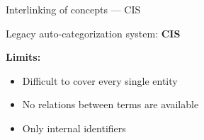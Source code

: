 \documentclass[10pt]{beamer}
\begin{document}
\begin{frame}[fragile]{Interlinking of concepts — CIS}

  Legacy auto-categorization system: {\textbf{CIS}}


  \bigskip
  \alert{\textbf{Limits:}}

  \begin{itemize}
    \item Difficult to cover every single entity
    \item No relations between terms are available
    \item Only internal identifiers
  \end{itemize}

\end{frame}
\end{document}
